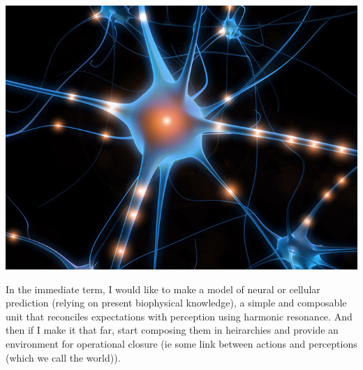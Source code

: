 \documentclass[12pt]{article}
\begin{document}
\includegraphics[scale=2.0]{1077neuron.jpg}

\vspace{15pt}

In the immediate term, I would like to make a model of neural or cellular prediction (relying on present biophysical knowledge), a simple and composable unit that reconciles expectations with perception using harmonic resonance.  And then if I make it that far, start composing them in heirarchies and provide an environment for operational closure (ie some link between actions and perceptions (which we call the world)).
\end{document}
